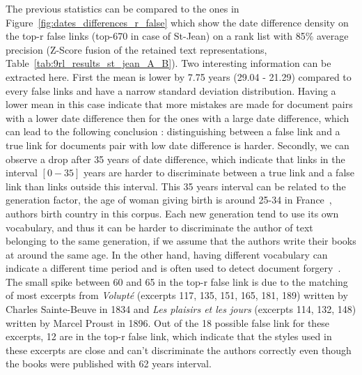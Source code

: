 The previous statistics can be compared to the ones in Figure~\ref{fig:dates_differences_r_false} which show the date difference density on the top-r false links (top-670 in case of St-Jean) on a rank list with 85\% average precision (Z-Score fusion of the retained text representations, Table~\ref{tab:9rl_results_st_jean_A_B}).
Two interesting information can be extracted here.
First the mean is lower by 7.75 years (29.04 - 21.29) compared to every false links and have a narrow standard deviation distribution.
Having a lower mean in this case indicate that more mistakes are made for document pairs with a lower date difference then for the ones with a large date difference, which can lead to the following conclusion : distinguishing between a false link and a true link for documents pair with low date difference is harder.
Secondly, we can observe a drop after 35 years of date difference, which indicate that links in the interval $\left[0-35\right]$ years are harder to discriminate between a true link and a false link than links outside this interval.
This 35 years interval can be related to the generation factor, the age of woman giving birth is around 25-34 in France~\cite{generations}, authors birth country in this corpus.
Each new generation tend to use its own vocabulary, and thus it can be harder to discriminate the author of text belonging to the same generation, if we assume that the authors write their books at around the same age.
In the other hand, having different vocabulary can indicate a different time period and is often used to detect document forgery~\cite{savoy_stylo}.
The small spike between 60 and 65 in the top-r false link is due to the matching of most excerpts from \textit{Volupté} (excerpts 117, 135, 151, 165, 181, 189) written by Charles Sainte-Beuve in 1834 and \textit{Les plaisirs et les jours} (excerpts 114, 132, 148) written by Marcel Proust in 1896.
Out of the 18 possible false link for these excerpts, 12 are in the top-r false link, which indicate that the styles used in these excerpts are close and can't discriminate the authors correctly even though the books were published with 62 years interval.

